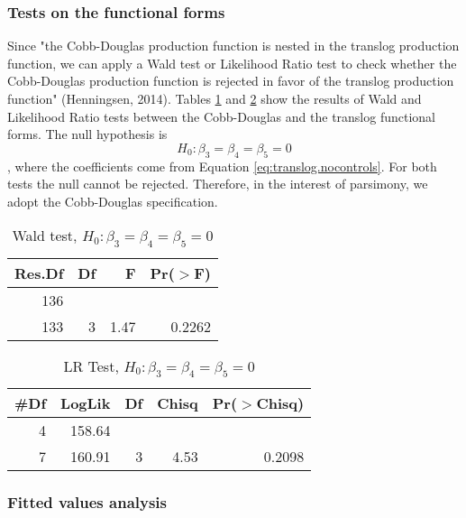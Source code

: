 \documentclass[12pt,a4paper]{article}\usepackage[]{graphicx}\usepackage[]{color}
\begin{document}
\subsubsection{Tests on the functional forms}
Since "the Cobb-Douglas production function is nested in the translog production function, we can apply a Wald test or Likelihood Ratio test to check whether the Cobb-Douglas production function is rejected in favor of the translog production function" (Henningsen, 2014). Tables \ref{WT} and \ref{LR} show the results of Wald and Likelihood Ratio tests between the Cobb-Douglas and the translog functional forms. The null hypothesis is $$H_0: \beta_3 = \beta_4 = \beta_5 = 0$$, where the coefficients come from Equation \ref{eq:translog.nocontrols}. For both tests the null cannot be rejected. Therefore, in the interest of parsimony, we adopt the Cobb-Douglas specification.%

\begin{table}[ht]
\centering
\caption{Wald test, $H_0: \beta_3 = \beta_4 = \beta_5 = 0$} 
\label{WT}
\begin{tabular}{rrrr}
  \hline
Res.Df & Df & F & Pr($>$F) \\ 
  \hline
136 &  &  &  \\ 
  133 & 3 & 1.47 & 0.2262 \\ 
   \hline
\end{tabular}
\end{table}
\begin{table}[ht]
\centering
\caption{LR Test, $H_0: \beta_3 = \beta_4 = \beta_5 = 0$} 
\label{LR}
\begin{tabular}{rrrrr}
  \hline
\#Df & LogLik & Df & Chisq & Pr($>$Chisq) \\ 
  \hline
4 & 158.64 &  &  &  \\ 
  7 & 160.91 & 3 & 4.53 & 0.2098 \\ 
   \hline
\end{tabular}
\end{table}




\subsubsection{Fitted values analysis}
\end{document}
